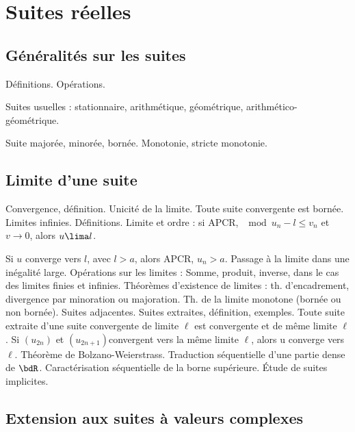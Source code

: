 \documentclass[a4paper,french,bookmarks]{article}
\begin{document}
\section*{Suites réelles}

\subsection*{Généralités sur les suites}

Définitions. Opérations.

Suites usuelles : stationnaire, arithmétique, géométrique, arithmético-géométrique.

Suite majorée, minorée, bornée. Monotonie, stricte monotonie.

\subsection*{Limite d’une suite}

\begin{enumerate}
    \itarr Convergence, définition. Unicité de la limite. Toute suite convergente est bornée.
    \itarr Limites infinies. Définitions.
    \itarr Limite et ordre : si APCR, $\mod{u_n - l} \leq v_n$ et $v \xrightarrow{} 0$, alors $u \lima l$. 
    
    Si $u$ converge vers $l$, avec $l > a$, alors APCR, $u_n > a$. Passage à la limite dans une inégalité large.
    \itarr Opérations sur les limites : Somme, produit, inverse, dans le cas des limites finies et infinies.
    \itarr Théorèmes d’existence de limites : th. d’encadrement, divergence par minoration ou majoration.
    \itarr Th. de la limite monotone (bornée ou non bornée). Suites adjacentes.
    \itarr Suites extraites, définition, exemples. Toute suite extraite d’une suite convergente de limite $\ell$ est convergente et de même limite $\ell$. Si $(u_{2n})$ et $(u_{2n+1})$convergent vers la même limite $\ell$, alors u converge vers $\ell$.
    \itarr Théorème de Bolzano-Weierstrass.
    \itarr Traduction séquentielle d’une partie dense de $\bdR$. Caractérisation séquentielle de la borne supérieure.
    \itarr Étude de suites implicites.
    
\end{enumerate}

\subsection*{Extension aux suites à valeurs complexes}
\end{document}
